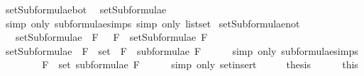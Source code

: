\begin{isabellebody}
\endisatagproof
{\isafoldproof}%
%
\isadelimproof
\isanewline
%
\endisadelimproof
\isanewline
{}\isamarkupfalse%
\ setSubformulae{\isacharunderscore}bot{\isacharcolon}\isanewline
\ \ {\isachardoublequoteopen}setSubformulae\ {\isacharparenleft}{\isasymbottom}{\isacharparenright}\ {\isacharequal}\ {\isacharbraceleft}{\isasymbottom}{\isacharbraceright}{\isachardoublequoteclose}\isanewline
%
\isadelimproof
\ \ \ \ %
\endisadelimproof
%
\isatagproof
{}\isamarkupfalse%
\ {\isacharparenleft}simp\ only{\isacharcolon}\ subformulae{\isachardot}simps{\isacharparenleft}{}{\isacharparenright}{\isacharcomma}\ simp\ only{\isacharcolon}\ list{\isachardot}set{\isacharparenright}%
\endisatagproof
{\isafoldproof}%
%
\isadelimproof
\isanewline
%
\endisadelimproof
\isanewline
{}\isamarkupfalse%
\ setSubformulae{\isacharunderscore}not{\isacharcolon}\isanewline
\ \ \ {\isachardoublequoteopen}setSubformulae\ {\isacharparenleft}\isactrlbold {\isasymnot}\ F{\isacharparenright}\ {\isacharequal}\ {\isacharbraceleft}\isactrlbold {\isasymnot}\ F{\isacharbraceright}\ {\isasymunion}\ setSubformulae\ F{\isachardoublequoteclose}\isanewline
%
\isadelimproof
%
\endisadelimproof
%
\isatagproof
{}\isamarkupfalse%
\ {\isacharminus}\isanewline
\ \ \isamarkupfalse%
\ {\isachardoublequoteopen}setSubformulae\ {\isacharparenleft}\isactrlbold {\isasymnot}\ F{\isacharparenright}\ {\isacharequal}\ set\ {\isacharparenleft}\isactrlbold {\isasymnot}\ F\ {\isacharhash}\ subformulae\ F{\isacharparenright}{\isachardoublequoteclose}\isanewline
\ \ \ \ \isamarkupfalse%
\ {\isacharparenleft}simp\ only{\isacharcolon}\ subformulae{\isachardot}simps{\isacharparenleft}{}{\isacharparenright}{\isacharparenright}\isanewline
\ \ \isamarkupfalse%
\ \isamarkupfalse%
\ {\isachardoublequoteopen}{\isasymdots}\ {\isacharequal}\ {\isacharbraceleft}\isactrlbold {\isasymnot}\ F{\isacharbraceright}\ {\isasymunion}\ set\ {\isacharparenleft}subformulae\ F{\isacharparenright}{\isachardoublequoteclose}\isanewline
\ \ \ \ \isamarkupfalse%
\ {\isacharparenleft}simp\ only{\isacharcolon}\ set{\isacharunderscore}insert{\isacharparenright}\isanewline
\ \ \isamarkupfalse%
\ \isamarkupfalse%
\ {\isacharquery}thesis\isanewline
\ \ \ \ \isamarkupfalse%
\ this\isanewline
{}\isamarkupfalse%
%
\endisatagproof
{\isafoldproof}%
%
\isadelimproof
\isanewline
%
\endisadelimproof
\isanewline
{}\isamarkupfalse%

\end{isabellebody}

